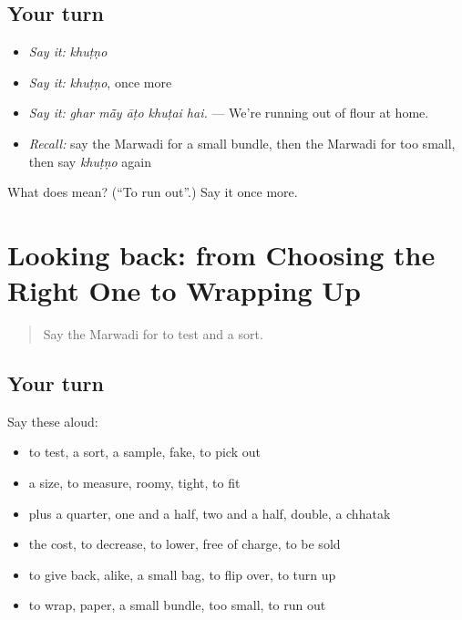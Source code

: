 \subsection*{Your turn}
\begin{itemize}
\raggedright
  \item \emph{Say it:} \emph{khuṭṇo}
  \item \emph{Say it:} \emph{khuṭṇo}, once more
  \item \emph{Say it:} \emph{ghar mā̃y āṭo khuṭai hai.} — We're running out of flour at home.
  \item \emph{Recall:} say the Marwadi for a small bundle, then the Marwadi for too small, then say \emph{khuṭṇo} again
\end{itemize}

\begin{tcolorbox}[breakable,colback=teal!4,colframe=teal!35!black,title={Before you move on}]
What does  mean? (\textquotedblleft{}To run out\textquotedblright{}.) Say it once more.
\end{tcolorbox}
\section[(dialogue)]{Looking back: from Choosing the Right One to Wrapping Up}

\label{lesson:MW-R215-review-210-215}



\begin{quote}
Say the Marwadi for to test and a sort.
\end{quote}

\subsection*{Your turn}
Say these aloud:

\begin{itemize}
\raggedright
  \item to test, a sort, a sample, fake, to pick out
  \item a size, to measure, roomy, tight, to fit
  \item plus a quarter, one and a half, two and a half, double, a chhatak
  \item the cost, to decrease, to lower, free of charge, to be sold
  \item to give back, alike, a small bag, to flip over, to turn up
  \item to wrap, paper, a small bundle, too small, to run out
\end{itemize}

